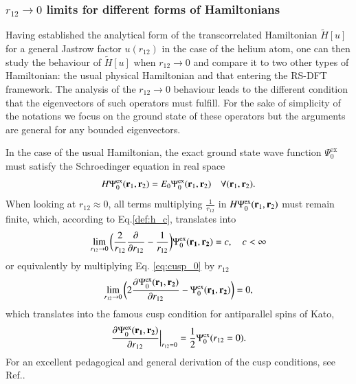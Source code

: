 \documentclass[aip,jcp,reprint,noshowkeys,superscriptaddress]{revtex4-1}
\newcommand{\deriv}[3]{\frac{\partial^{#3} #1}{\partial {#2}^{#3}}}
\newcommand{\bd}[1]{{\bf {#1}}}
\newcommand{\br}[0]{{\bf {r}}}
\newcommand{\psiex}[0]{\Psi^{\text{ex}}_0}
\begin{document}
\subsubsection{$r_{12} \rightarrow 0$ limits for different forms of Hamiltonians}
\label{sec:cusp}
Having established the analytical form of the transcorrelated Hamiltonian $\tilde{H}[u]$ for a general Jastrow factor $u(r_{12})$ in the case of the helium atom, one can then study the behaviour of $\tilde{H}[u]$ when $r_{12}\rightarrow 0$ and compare it to two other types of Hamiltonian: the usual physical Hamiltonian and that entering the RS-DFT framework. 
The analysis of the $r_{12}\rightarrow 0$ behaviour leads to the different condition that the eigenvectors of such operators must fulfill. For the sake of simplicity of the notations we focus on the ground state of these operators but the arguments are general for any bounded eigenvectors. 

In the case of the usual Hamiltonian, the exact ground state wave function $\psiex$ must satisfy the Schroedinger equation in real space 
\begin{equation}
 H \psiex(\br{}_1,\br{}_2) = E_0 \psiex(\br{}_1,\br{}_2)\quad \forall (\br{}_1,\br{}_2).
\end{equation}
When looking at $r_{12}\approx 0$, all terms multiplying $\frac{1}{r_{12}}$ in $H \psiex(\br{}_1,\br{}_2)$ must remain finite, which, according to Eq.\eqref{def:h_c}, translates into
\begin{equation}
 \label{eq:cusp_0}
 \lim_{r_{12}\rightarrow 0}\bigg( \frac{2}{r_{12}} \deriv{}{r_{12}}{} -\frac{1}{r_{12}}\bigg) \psiex(\bd{r_1},\bd{r_2})  = c,\quad c<\infty 
\end{equation}
or equivalently by multiplying Eq. \eqref{eq:cusp_0} by $r_{12}$
\begin{equation}
 \lim_{r_{12}\rightarrow 0}\bigg( 2 \deriv{\psiex(\bd{r_1},\bd{r_2})}{r_{12}}{} -\psiex(\bd{r_1},\bd{r_2}) \bigg) = 0, 
\end{equation}
which translates into the famous cusp condition for antiparallel spins of Kato\cite{Kat-CPAM-57}, 
\begin{equation}
 \deriv{\psiex(\bd{r_1},\bd{r_2})}{r_{12}}{}\Bigr|_{r_{12}=0} = \frac{1}{2} \psiex(r_{12}=0). 
\end{equation} 
For an excellent pedagogical and general derivation of the cusp conditions, see Ref.. 
\end{document}
